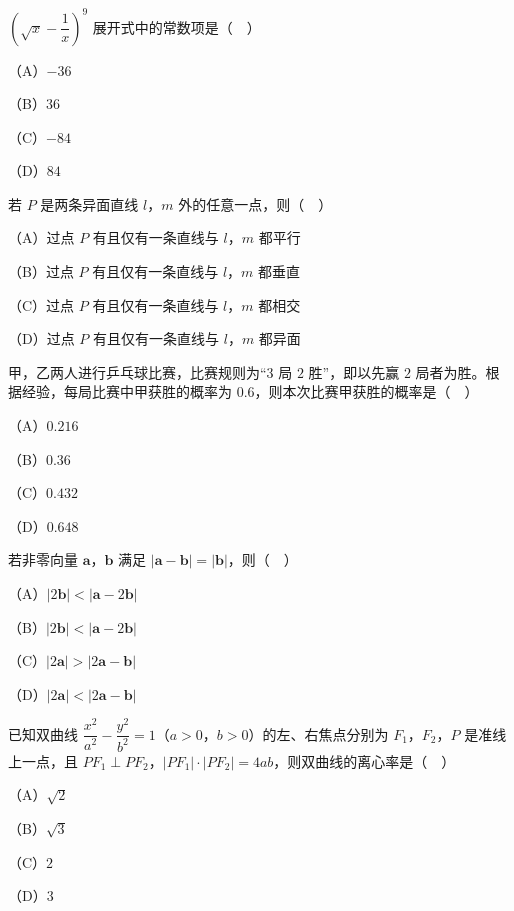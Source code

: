 \begin{question}
$\left(\sqrt x-\dfrac1x\right)^9$ 展开式中的常数项是（　）

（A）$-36$

（B）$36$

（C）$-84$

（D）$84$

\end{question}
\begin{question}
若 $P$ 是两条异面直线 $l$，$m$ 外的任意一点，则（　）

（A）过点 $P$ 有且仅有一条直线与 $l$，$m$ 都平行

（B）过点 $P$ 有且仅有一条直线与 $l$，$m$ 都垂直

（C）过点 $P$ 有且仅有一条直线与 $l$，$m$ 都相交

（D）过点 $P$ 有且仅有一条直线与 $l$，$m$ 都异面

\end{question}
\begin{question}
甲，乙两人进行乒乓球比赛，比赛规则为“$3$ 局 $2$ 胜”，即以先赢 $2$ 局者为胜。根据经验，每局比赛中甲获胜的概率为 $0.6$，则本次比赛甲获胜的概率是（　）

（A）$0.216$

（B）$0.36$

（C）$0.432$

（D）$0.648$

\end{question}
\begin{question}
若非零向量 $\boldsymbol a$，$\boldsymbol b$ 满足 $|\boldsymbol a-\boldsymbol b|=|\boldsymbol b|$，则（　）

（A）$|2\boldsymbol b|<|\boldsymbol a-2\boldsymbol b|$

（B）$|2\boldsymbol b|<|\boldsymbol a-2\boldsymbol b|$

（C）$|2\boldsymbol a|>|2\boldsymbol a-\boldsymbol b|$

（D）$|2\boldsymbol a|<|2\boldsymbol a-\boldsymbol b|$

\end{question}
\begin{question}
已知双曲线 $\dfrac{x^2}{a^2}-\dfrac{y^2}{b^2}=1$（$a>0$，$b>0$）的左、右焦点分别为 $F_1$，$F_2$，$P$ 是准线上一点，且 $PF_1\perp PF_2$，$|PF_1|\cdot|PF_2|=4ab$，则双曲线的离心率是（　）

（A）$\sqrt2$

（B）$\sqrt3$

（C）$2$

（D）$3$

\end{question}

